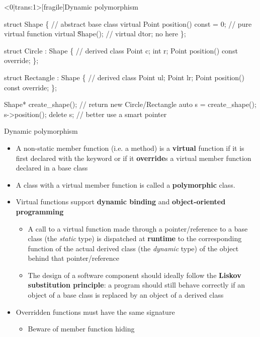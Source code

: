 \begin{frame}<0|trans:1>[fragile]{Dynamic polymorphism \insertcontinuationtext}

  \begin{codeblock}{
struct Shape \{                     // \alert{abstract} base class
  \alert{virtual} Point position() const \alert{= 0}; // \alert{pure virtual} function
  \alert{virtual} \~Shape();                // virtual dtor; no  here
\};

struct Circle : Shape \{ // derived class
  Point c;
  int r;
  Point position() const \alert{override};
\};

struct Rectangle : Shape \{ // derived class
  Point ul;
  Point lr;
  Point position() const \alert{override};
\};

Shape\alert{*} create_shape();   // return \alert{new} Circle/Rectangle
auto s = create_shape();
s->position();
delete s;                // better use a smart pointer
}\end{codeblock}

\end{frame}

\begin{frame}{Dynamic polymorphism \insertcontinuationtext}

  \begin{itemize}
  \item<1-> A non-static member function (i.e. a method) is a \textbf{virtual}
    function if it is first declared with the keyword  or if it
    \textbf{override}s a virtual member function declared in a base class
  \item<1-> A class with a virtual member function is called a
    \textbf{polymorphic} class.
  \item<2-> Virtual functions support \textbf{dynamic binding} and
    \textbf{object-oriented programming}
    \begin{itemize}
    \item A call to a virtual function made through a pointer/reference to a
      base class (the \textit{static} type) is dispatched at \textbf{runtime} to
      the corresponding function of the actual derived class (the
      \textit{dynamic} type) of the object behind that pointer/reference
    \item The design of a software component should ideally follow the
      \textbf{Liskov substitution principle}: a program should still behave
      correctly if an object of a base class is replaced by an object of a
      derived class
    \end{itemize}
  \item<2-> Overridden functions must have the same signature
    \begin{itemize}
    \item Beware of member function hiding
    \end{itemize}
  \end{itemize}

\end{frame}

